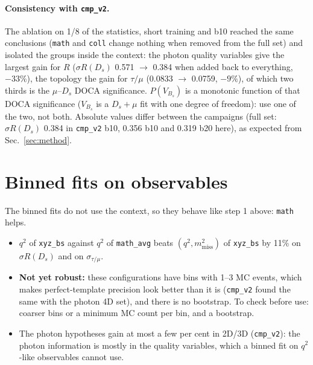 \documentclass[10pt,a4paper]{article}
\newcommand{\code}[1]{\texttt{#1}}
\newcommand{\Ds}{D_s}
\newcommand{\mm}{m^2_\text{miss}}
\newcommand{\PV}{P(V_{B_s})}
\newcommand{\sR}{\sigma R}
\begin{document}
\paragraph{Consistency with \code{cmp\_v2}.} The ablation on 1/8 of the statistics, short training and b10 reached the
same conclusions (\code{math} and \code{coll} change nothing when removed from the full set) and isolated the groups
inside the context: the photon quality variables give the largest gain for $R$ ($\sR(\Ds)$ 0.571 $\to$ 0.384 when added
back to everything, $-33\%$), the topology the gain for $\tau/\mu$ (0.0833 $\to$ 0.0759, $-9\%$), of which two thirds is
the $\mu$--$\Ds$ DOCA significance. $\PV$ is a monotonic function of that DOCA significance ($V_{B_s}$ is a $\Ds+\mu$
fit with one degree of freedom): use one of the two, not both. Absolute values differ between the campaigns (full set:
$\sR(\Ds)$ 0.384 in \code{cmp\_v2} b10, 0.356 b10 and 0.319 b20 here), as expected from Sec.~\ref{sec:method}.

\section{Binned fits on observables}
\label{sec:binned}

The binned fits do not use the context, so they behave like step 1 above: \code{math} helps.

\begin{table}[H]
\centering\small
\caption{Best 2D (12 bins per axis) and 3D (6 per axis) combinations among the 15 observables of \code{xyz\_bs},
\code{coll}, \code{math1}, \code{math2}, \code{math\_avg}; first row of each block: the best \code{xyz\_bs}-only set.}

\end{table}

\begin{itemize}
\item $q^2$ of \code{xyz\_bs} against $q^2$ of \code{math\_avg} beats $(q^2,\mm)$ of \code{xyz\_bs} by 11\% on
  $\sR(\Ds)$ and on $\sigma_{\tau/\mu}$.
\item \textbf{Not yet robust:} these configurations have bins with 1--3 MC events, which makes perfect-template
  precision look better than it is (\code{cmp\_v2} found the same with the photon 4D set), and there is no bootstrap.
  To check before use: coarser bins or a minimum MC count per bin, and a bootstrap.
\item The photon hypotheses gain at most a few per cent in 2D/3D (\code{cmp\_v2}): the photon information is mostly in
  the quality variables, which a binned fit on $q^2$-like observables cannot use.
\end{itemize}
\end{document}

